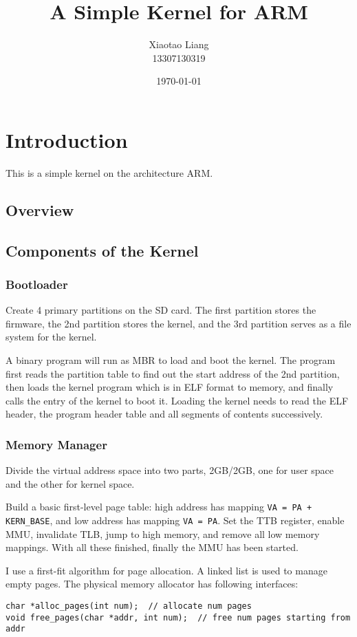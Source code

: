 \documentclass[12pt, a4paper]{article}
\title{A Simple Kernel for ARM}
\author{Xiaotao Liang \\ \small 13307130319}
\date{\today}
\begin{document}
\maketitle

\section{Introduction}
This is a simple kernel on the architecture ARM.

\subsection{Overview}

\subsection{Components of the Kernel}

\subsubsection{Bootloader}
Create 4 primary partitions on the SD card. The first partition stores the firmware, the 2nd partition stores the kernel, and the 3rd partition serves as a file system for the kernel.

A binary program will run as MBR to load and boot the kernel. The program first reads the partition table to find out the start address of the 2nd partition, then loads the kernel program which is in ELF format to memory, and finally calls the entry of the kernel to boot it. Loading the kernel needs to read the ELF header, the program header table and all segments of contents successively.

\subsubsection{Memory Manager}
Divide the virtual address space into two parts, 2GB/2GB, one for user space and the other for kernel space.

Build a basic first-level page table: high address has mapping \verb|VA = PA + KERN_BASE|, and low address has mapping \verb|VA = PA|. Set the TTB register, enable MMU, invalidate TLB, jump to high memory, and remove all low memory mappings. With all these finished, finally the MMU has been started.

I use a first-fit algorithm for page allocation. A linked list is used to manage empty pages. The physical memory allocator has following interfaces:
\begin{lstlisting}
char *alloc_pages(int num);  // allocate num pages
void free_pages(char *addr, int num);  // free num pages starting from addr
\end{lstlisting}
\end{document}
